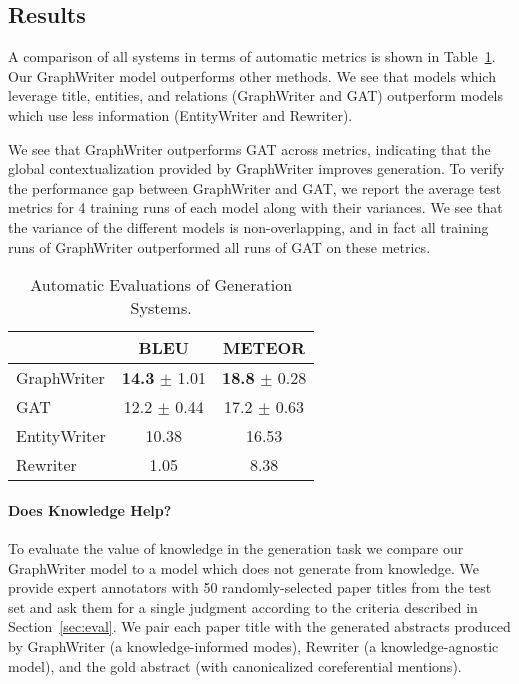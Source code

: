 \documentclass[11pt,a4paper]{article}
\begin{document}
\subsection{Results} 
A comparison of all systems in terms of automatic metrics is shown in Table~\ref{tab:compare}.
Our GraphWriter model outperforms other methods.
We see that models which leverage title, entities, and relations (GraphWriter and GAT) outperform models which use less information (EntityWriter and Rewriter). 

We see that GraphWriter outperforms GAT across metrics, indicating that the global contextualization provided by GraphWriter improves generation. 
To verify the performance gap between GraphWriter and GAT, we report the average test metrics for 4 training runs of each model along with their variances. 
We see that the variance of the different models is non-overlapping, and in fact all training runs of GraphWriter outperformed all runs of GAT on these metrics. 

\begin{table}\begin{small}
\begin{center}
\begin{tabular}{lcc}
     & BLEU & METEOR \\ \hline
    GraphWriter  & {\bf 14.3} $\pm$ 1.01 & {\bf 18.8} $\pm$ 0.28  \\
    GAT & 12.2 $\pm$ 0.44 & 17.2 $\pm$ 0.63  \\
    EntityWriter & 10.38 & 16.53 \\ 
    Rewriter & 1.05 & 8.38 \\ \hline
\end{tabular}
\caption{Automatic Evaluations of Generation Systems.}
\label{tab:compare}
\end{center}\end{small}
\end{table}


\paragraph{Does Knowledge Help?}
To evaluate the value of knowledge in the generation task we compare our GraphWriter model to a model which does not generate from knowledge.  
We provide expert annotators with 50 randomly-selected paper titles from the test set and ask them for a single judgment according to the criteria described in Section~\ref{sec:eval}. 
We pair each paper title with the generated abstracts produced by GraphWriter (a knowledge-informed modes), Rewriter (a knowledge-agnostic model), and the gold abstract (with canonicalized coreferential mentions).
\end{document}

